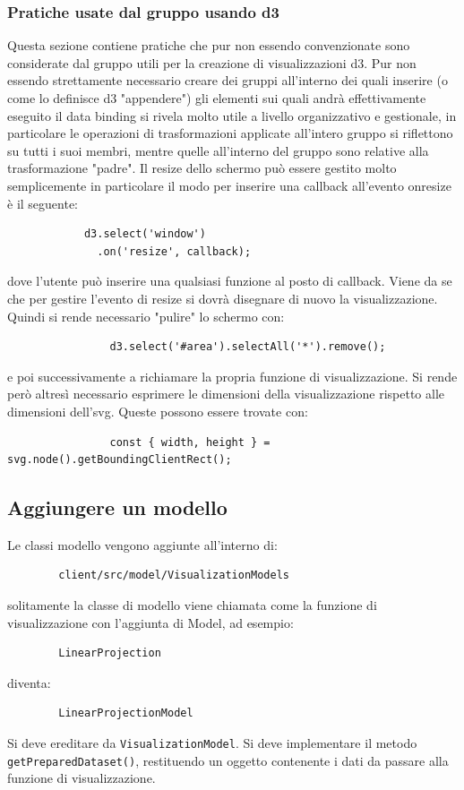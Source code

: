         \subsubsection{Pratiche usate dal gruppo usando d3}
            Questa sezione contiene pratiche che pur non essendo convenzionate sono considerate dal gruppo utili per la creazione di visualizzazioni d3.
            Pur non essendo strettamente necessario creare dei gruppi all'interno dei quali inserire (o come lo definisce d3 "appendere") gli elementi sui quali andrà effettivamente eseguito il data binding si rivela molto utile a livello organizzativo e gestionale, in particolare le operazioni di trasformazioni applicate all'intero gruppo si riflettono su tutti i suoi membri, mentre quelle all'interno del gruppo sono relative alla trasformazione "padre".
            Il resize dello schermo può essere gestito molto semplicemente in particolare il modo per inserire una callback all'evento onresize è il seguente:
            \begin{verbatim}
            d3.select('window')
              .on('resize', callback);
            \end{verbatim}
            dove l'utente può inserire una qualsiasi funzione al posto di callback. Viene da se che per gestire l'evento di resize si dovrà disegnare di nuovo la visualizzazione. Quindi si rende necessario "pulire" lo schermo con:
            \begin{verbatim}
                d3.select('#area').selectAll('*').remove();
            \end{verbatim}
            e poi successivamente a richiamare la propria funzione di visualizzazione.
            Si rende però altresì necessario esprimere le dimensioni della visualizzazione rispetto alle dimensioni dell'svg. Queste possono essere trovate con:
            \begin{verbatim}
                const { width, height } = svg.node().getBoundingClientRect();
            \end{verbatim}
    \subsection{Aggiungere un modello}
    Le classi modello vengono aggiunte all'interno di:
    \begin{verbatim}
        client/src/model/VisualizationModels
    \end{verbatim}
    solitamente la classe di modello viene chiamata come la funzione di visualizzazione con l'aggiunta di Model, ad esempio:
    \begin{verbatim}
        LinearProjection
    \end{verbatim}
    diventa:
    \begin{verbatim}
        LinearProjectionModel
    \end{verbatim}
    Si deve ereditare da \texttt{VisualizationModel}. Si deve implementare il metodo \texttt{getPreparedDataset()}, restituendo un oggetto contenente i dati da passare alla funzione di visualizzazione.
    

